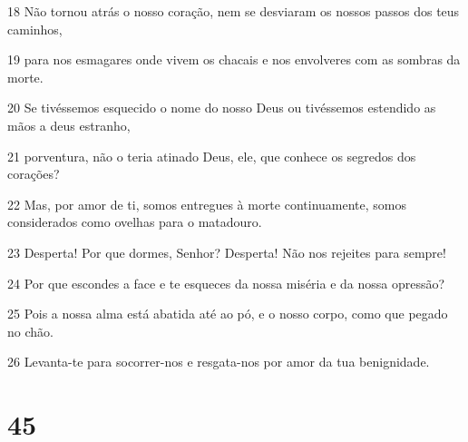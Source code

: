 \par 18 Não tornou atrás o nosso coração, nem se desviaram os nossos passos dos teus caminhos,
\par 19 para nos esmagares onde vivem os chacais e nos envolveres com as sombras da morte.
\par 20 Se tivéssemos esquecido o nome do nosso Deus ou tivéssemos estendido as mãos a deus estranho,
\par 21 porventura, não o teria atinado Deus, ele, que conhece os segredos dos corações?
\par 22 Mas, por amor de ti, somos entregues à morte continuamente, somos considerados como ovelhas para o matadouro.
\par 23 Desperta! Por que dormes, Senhor? Desperta! Não nos rejeites para sempre!
\par 24 Por que escondes a face e te esqueces da nossa miséria e da nossa opressão?
\par 25 Pois a nossa alma está abatida até ao pó, e o nosso corpo, como que pegado no chão.
\par 26 Levanta-te para socorrer-nos e resgata-nos por amor da tua benignidade.

\chapter{45}

